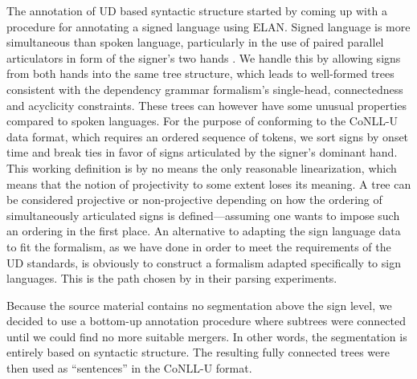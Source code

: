 \documentclass[11pt]{article}
\begin{document}
The annotation of UD based syntactic structure started by coming up with a procedure for annotating a signed language using ELAN. Signed language is more simultaneous than spoken language, particularly in the use of paired parallel articulators in form of the signer's two hands \cite{Vermeerbergen2007simultaneity}.
We handle this by allowing signs from both hands into the same tree structure,
which leads to well-formed trees consistent with the dependency grammar
formalism's single-head, connectedness and acyclicity constraints.
These trees can however have some unusual properties compared to spoken
languages.
For the purpose of conforming to the CoNLL-U data format,
which requires an ordered sequence of tokens, we sort
signs by onset time and break ties in favor of signs articulated by the
signer's dominant hand.
This working definition is by no means the only reasonable linearization,
which means that the notion of projectivity to some extent loses its meaning.
A tree can be considered projective or non-projective depending on how the
ordering of simultaneously articulated signs is defined---assuming one wants
to impose such an ordering in the first place.
An alternative to adapting the sign language data to fit the formalism,
as we have done in order to meet the requirements of the UD standards,
is obviously to construct a formalism adapted specifically to sign languages.
This is the path chosen by  in their parsing
experiments.

Because the source material contains no segmentation above the sign level,
we decided to use a bottom-up annotation procedure where subtrees were
connected until we could find no more suitable mergers. In other words,
the segmentation is entirely based on syntactic structure. The resulting fully
connected trees were then used as ``sentences'' in the CoNLL-U format.
\end{document}
